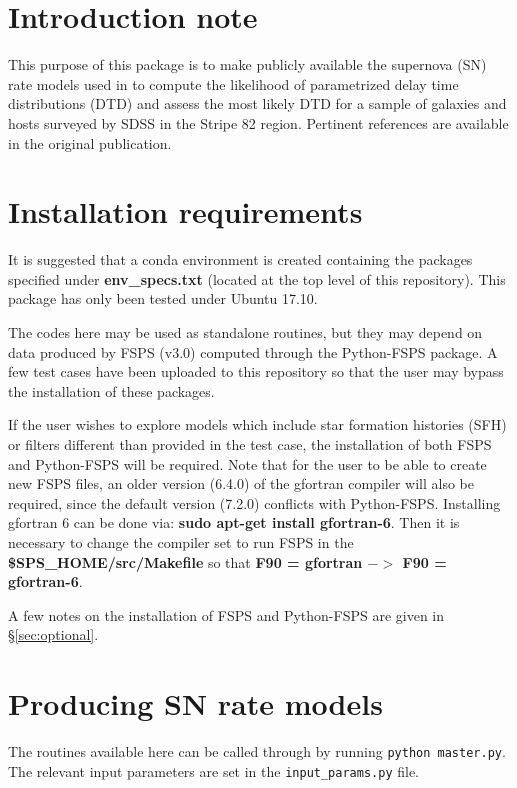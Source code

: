 \documentclass[manuscript]{aastex}
\begin{document}
\section{Introduction note}
\label{sec:intro}

This purpose of this package is to make publicly available the supernova (SN) rate models used in \citet{Heringer2017_DTD} to compute the likelihood of parametrized delay time distributions (DTD) and assess the most likely DTD for a sample of galaxies and hosts surveyed by SDSS in the Stripe 82 region. Pertinent references are available in the original publication.

\section{Installation requirements}
\label{sec:requirements}

It is suggested that a conda environment is created containing the packages specified under \textbf{env\_specs.txt} (located at the top level of this repository). This package has only been tested under Ubuntu 17.10.

The codes here may be used as standalone routines, but they
may depend on data produced by FSPS (v3.0) computed through the Python-FSPS package. A few test cases have been uploaded to this repository so that the user may bypass the installation of these packages.

If the user wishes to explore models which include
star formation histories (SFH) or filters different than provided in the test case, the installation of both FSPS and Python-FSPS will be required. Note that for the user to be able to create new FSPS files, an older version (6.4.0) of the gfortran compiler will also be required, since the default version (7.2.0) conflicts with Python-FSPS. Installing gfortran 6 can be done via: \textbf{sudo apt-get install gfortran-6}. Then it is necessary to change the compiler set to run FSPS in the \textbf{\$SPS\_HOME/src/Makefile} so that \textbf{F90 = gfortran $->$ F90 = gfortran-6}.

A few notes on the installation of FSPS and Python-FSPS are given in \S \ref{sec:optional}.

\section{Producing SN rate models}
\label{sec:usage}

The routines available here can be called through by running \texttt{python master.py}. The relevant input parameters are set in the \texttt{input\_params.py} file.
\end{document}
